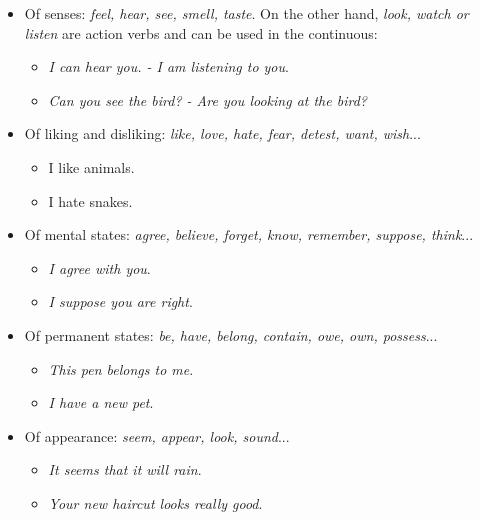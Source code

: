 \begin{itemize}
\begin{itemize}

\item Of senses: \textit{feel, hear, see, smell, taste}. On the other hand, \textit{look, watch or listen} are action verbs and can be used in the continuous:

\begin{itemize}
\item\textit{I can hear you. - I am listening to you}.
\item\textit{Can you see the bird? - Are you looking at the bird?}
\end{itemize}

\item  Of liking and disliking: \textit{like, love, hate, fear, detest, want, wish}...

\begin{itemize}
\item I like animals.
\item I hate snakes.
\end{itemize}

\item Of mental states: \textit{agree, believe, forget, know, remember, suppose, think}...

\begin{itemize}
\item\textit{I agree with you}.
\item\textit{I suppose you are right}.
\end{itemize}

\item Of permanent states: \textit{be, have, belong, contain, owe, own, possess}...

\begin{itemize}
\item\textit{This pen belongs to me}.
\item\textit{I have a new pet}.
\end{itemize}

\item Of appearance: \textit{seem, appear, look, sound}...

\begin{itemize}
\item\textit{It seems that it will rain}.
\item\textit{Your new haircut looks really good}.
\end{itemize}

\end{itemize}

\end{itemize}

